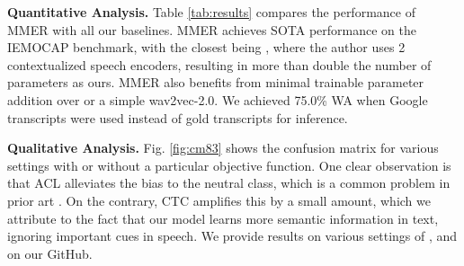 \documentclass{INTERSPEECH2023}
\begin{document}
{\noindent \textbf{Quantitative Analysis.}} Table \ref{tab:results} compares the performance of MMER with all our baselines. MMER achieves SOTA performance on the IEMOCAP benchmark, with the closest being \cite{morais_self}, where the author uses 2 contextualized speech encoders, resulting in more than double the number of parameters as ours. MMER also benefits from minimal trainable parameter addition over \cite{cai2021speech} or a simple wav2vec-2.0. We achieved 75.0\% WA when Google transcripts were used instead of gold transcripts for inference.
\vspace{1mm}

{\noindent \textbf{Qualitative Analysis.}} Fig. \ref{fig:cm83} shows the confusion matrix for various settings with or without a particular objective function. One clear observation is that ACL alleviates the bias to the neutral class, which is a common problem in prior art \cite{keysparse}. On the contrary, CTC amplifies this by a small amount, which we attribute to the fact that our model learns more semantic information in text, ignoring important cues in speech. We provide results on various settings of , and  on our GitHub.
\end{document}
